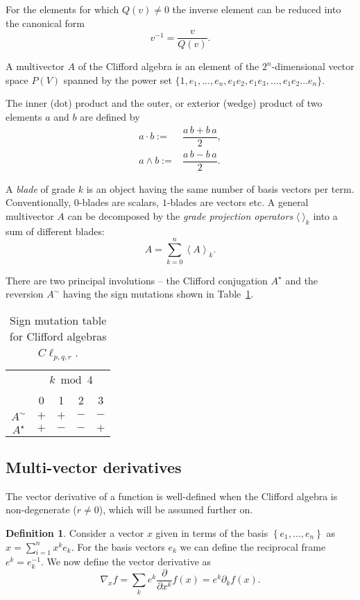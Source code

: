 \documentclass[twoside,reqno,11pt]{amsart}
\theoremstyle{definition}
\newtheorem{defn}[thm]{Definition}
\theoremstyle{remark}
\numberwithin{equation}{section}
\newcommand{\mvectdiff}[1]{ \nabla_#1 }
\newcommand {\grpart}[1]{\ensuremath{\left\langle #1 \right\rangle  }}
\begin{document}
For the elements for which $Q(v) \neq 0$ the inverse element can be reduced into the canonical form
\begin{equation}
v^{-1} = \dfrac{v}{Q(v)}.
\end{equation}

A multivector $A$ of the Clifford algebra is an element of the $2^n$-dimensional vector  space $ P (V) $ spanned by the power set $\{1,e_1,...,e_n,e_1e_2,e_1e_3,...,e_1e_2...e_n\}$.

The inner (dot) product and the outer, or exterior (wedge) product of two elements $a$ and $b$ are defined by
\begin{align}
a \cdot  b := & \dfrac{a\,b + b\,a}{2},  \\
a \wedge b := & \dfrac{a\,b - b\,a}{2}.
\end{align}

A {\em blade} of grade $k$ is an object having the same number of  basis vectors per term.
Conventionally,  $0$-blades are scalars,  $1$-blades are vectors etc.
A general multivector $A$ can be decomposed by the \textit{grade projection operators} $\langle~\rangle_k$ into a sum of different blades:
\begin{equation}
 A = \sum\limits_{k=0}^n \grpart{ A }_k.
\end{equation}

There are two principal involutions -- the Clifford conjugation
$ A^\star $ and the reversion
$ A^\sim $ having the sign mutations shown in Table~\ref{tb:signs}.

\begin{table}
\caption{\label{tb:signs}Sign mutation table for Clifford algebras $C\ell_{p,q,r}$.}
\begin{tabular}{c|cccc}
~&\multicolumn{4}{c}{$k\bmod 4$}\\
~ & 0 & 1 & 2 & 3 \\
\hline
$A^\sim$  & $+$ & $+$ & $-$ & $-$ \\
$A^\star$ & $+$ & $-$ & $-$ & $+$
\end{tabular}
\end{table}

\subsection{Multi-vector derivatives}
\label{sec:mvd}

The vector derivative of a function is well-defined when the Clifford algebra is non-degenerate ($r \neq 0$), which will be assumed further on.
\begin{defn}
	Consider a vector $x$  given in terms of the basis $\left\lbrace  e_1,   \ldots , e_n \right\rbrace $ as $x=\sum_{i=1}^n x^ke_k$.
	For the basis vectors $e_k$ we can define the reciprocal frame $e^k=e_k^{-1}$.
	We now define the vector derivative \cite{Doran2003} as
\begin{equation}
	\mvectdiff{x} f = \sum_ke^k\frac{\partial}{\partial x^k} f(x) =e^k\partial_k f(x) .
\end{equation}
\end{defn}
\end{document}
